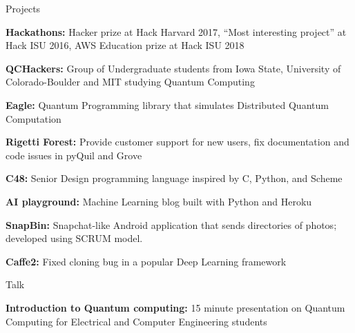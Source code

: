 \documentclass{resume} %
\begin{document}

\begin{rSection}{Projects}


{\bf Hackathons:} Hacker prize at Hack Harvard 2017, “Most interesting project” at Hack ISU 2016, AWS Education prize at Hack ISU 2018

{\bf QCHackers:}
Group of Undergraduate students from Iowa State, University of Colorado-Boulder and MIT studying Quantum Computing

{\bf Eagle:}
Quantum Programming library that simulates Distributed Quantum Computation

{\bf Rigetti Forest:}
Provide customer support for new users, fix documentation and code issues in pyQuil and Grove

{\bf C48:}
Senior Design programming language inspired by C, Python, and Scheme

{\bf AI playground:}
Machine Learning blog built with Python and Heroku

{\bf SnapBin:}
Snapchat-like Android application that sends directories of photos; developed using SCRUM model.

{\bf Caffe2:}
Fixed cloning bug in a popular Deep Learning framework

\end{rSection}

\begin{rSection}{Talk}

{\bf Introduction to Quantum computing:}
15 minute presentation on Quantum Computing for Electrical and Computer Engineering students

\end{rSection}



\end{document}
